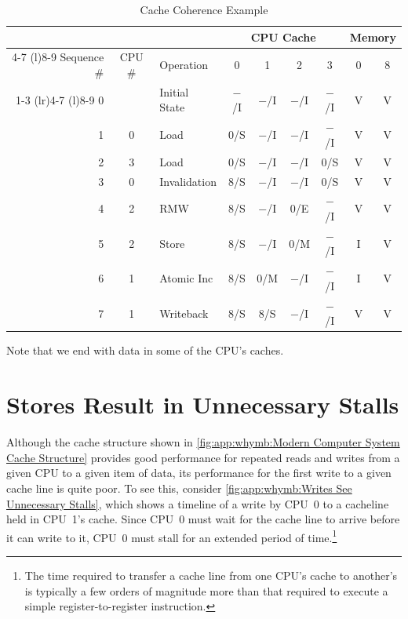 \begin{table}
\small
\centering
\renewcommand*{\arraystretch}{1.2}
\begin{tabular}{rclcccccc}
	\toprule
	& & & \multicolumn{4}{c}{CPU Cache} & \multicolumn{2}{c}{Memory} \\
	\cmidrule(lr){4-7} \cmidrule(l){8-9}
	Sequence \# & CPU \# & Operation & 0 & 1 & 2 & 3 & 0 & 8 \\
	\cmidrule(r){1-3} \cmidrule(lr){4-7} \cmidrule(l){8-9}
	0 &   & Initial State	& $-$/I & $-$/I & $-$/I & $-$/I   & V & V \\
	1 & 0 & Load		& 0/S &   $-$/I & $-$/I & $-$/I   & V & V \\
	2 & 3 & Load		& 0/S &   $-$/I & $-$/I & 0/S     & V & V \\
	3 & 0 & Invalidation	& 8/S &   $-$/I & $-$/I & 0/S     & V & V \\
	4 & 2 & RMW		& 8/S &   $-$/I & 0/E &   $-$/I   & V & V \\
	5 & 2 & Store		& 8/S &   $-$/I & 0/M &   $-$/I   & I & V \\
	6 & 1 & Atomic Inc	& 8/S &   0/M &   $-$/I & $-$/I   & I & V \\
	7 & 1 & Writeback	& 8/S &   8/S &   $-$/I & $-$/I   & V & V \\
	\bottomrule
\end{tabular}
\caption{Cache Coherence Example}
\label{tab:app:whymb:Cache Coherence Example}
\end{table}

Note that we end with data in some of the CPU's caches.

\QuickQuizEnd

\section{Stores Result in Unnecessary Stalls}
\label{sec:app:whymb:Stores Result in Unnecessary Stalls}

Although the cache structure shown in
\cref{fig:app:whymb:Modern Computer System Cache Structure}
provides good performance for repeated reads and writes from a given CPU
to a given item of data, its performance for the first write to
a given cache line is quite poor.
To see this, consider
\cref{fig:app:whymb:Writes See Unnecessary Stalls},
which shows a timeline of a write by CPU~0 to a cacheline held in
CPU~1's cache.
Since CPU~0 must wait for the cache line to arrive before it can
write to it, CPU~0 must stall for an extended period of time.\footnote{
	The time required to transfer a cache line from one CPU's cache
	to another's is typically a few orders of magnitude more than
	that required to execute a simple register-to-register instruction.}

